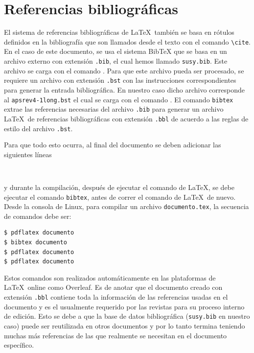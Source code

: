 \documentclass{article}
\begin{document}
\section{Referencias bibliográficas}
El sistema de referencias bibliográficas de \LaTeX\ también se basa en rótulos definidos en la bibliografía que son llamados desde el texto con el comando  \verb|\cite|. En el caso de este documento, se usa el sistema BibTeX que se basa en un archivo externo con extensión \verb|.bib|, el cual hemos llamado \verb|susy.bib|. Este archivo  se carga con el comando \verb||. Para que este archivo pueda ser procesado, se requiere un archivo con extensión \verb|.bst|  con las instrucciones correspondientes para generar la entrada bibliográfica. En nuestro caso dicho  archivo corresponde al \verb|apsrev4-1long.bst| el cual se carga con el comando \verb||.
El comando \verb|bibtex| extrae las referencias necesarias del archivo \verb|.bib| para generar un archivo \LaTeX\ de referencias bibliográficas con extensión \verb|.bbl| de acuerdo a las reglas de estilo del archivo \verb|.bst|.

Para que todo esto ocurra, al final del documento se deben adicionar las siguientes líneas 
\begin{lstlisting}


\end{lstlisting}
y durante la compilación, después de ejecutar el comando de \LaTeX, se debe ejecutar el comando \verb|bibtex|, antes de correr el comando de \LaTeX\ de nuevo. Desde la consola de Linux, para compilar un archivo \verb|documento.tex|, la secuencia de comandos debe ser:
\begin{lstlisting}
$ pdflatex documento 
$ bibtex documento
$ pdflatex documento 
$ pdflatex documento 
\end{lstlisting}
Estos comandos son realizados automáticamente en las plataformas de \LaTeX\ online como Overleaf. 
Es de anotar que el documento creado con extensión \verb|.bbl| contiene toda la información de las referencias usadas en el documento y es el usualmente requerido por las revistas para su proceso interno de edición. Esto se debe a que la base de datos  bibliográfica (\verb|susy.bib| en nuestro caso)  puede ser reutilizada en otros documentos y por lo tanto termina teniendo muchas más referencias de las que realmente se necesitan en el documento específico.
\end{document}
